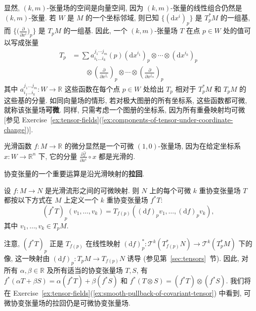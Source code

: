 显然, $(k,m)$-张量场的空间是向量空间, 因为 $(k,m)$-张量的线性组合仍然是 $(k,m)$-张量. 若 $W$ 是 $M$ 的一个坐标邻域, 则已知 $\{(\mathrm{d}x^i)_p\}$ 是 $T_p^*M$ 的一组基, 而 $\bigl\{\bigl(\frac{\partial}{\partial x^i}\bigr)_p\bigr\}$ 是 $T_pM$ 的一组基. 因此, 一个 $(k,m)$-张量场 $T$ 在点 $p\in W$ 处的值可以写成张量
\begin{align*}
  T_p&=\sum a_{i_1\ldots i_k}^{j_1\cdots j_m}(p)
  (\mathrm{d}x^{i_1})_p\otimes\cdots\otimes(\mathrm{d}x^{i_k})_p\\
  &\qquad\otimes\left(\frac{\partial}{\partial x^{j_1}}\right)_p
  \otimes\cdots\otimes\left(\frac{\partial}{\partial x^{j_m}}\right)_p
\end{align*}
其中 $a_{i_1\ldots i_k}^{j_1\ldots j_m}:W\to\mathbb{R}$ 这些函数在每个点 $p\in W$ 处给出 $T_p$ 相对于 $T_p^*M$ 和 $T_pM$ 的这些基的分量. 如同向量场的情形, 若对极大图册的所有坐标系, 这些函数都可微, 就称该张量场\textbf{可微}. 同样, 只需考虑一个图册的坐标系, 因为所有重叠映射均可微 [参见 Exercise~\ref{ex:tensor-fields}(\ref{ex:components-of-tensor-under-coordinate-change})].

\begin{RiemannExample}\label{ex:smooth-function-has-smooth-differential}
光滑函数 $f:M\to\mathbb{R}$ 的微分显然是一个可微 $(1,0)$-张量场, 因为在给定坐标系 $x:W\to\mathbb{R}^n$ 下, 它的分量 $\frac{\partial\widehat f}{\partial x^i}\circ x$ 都是光滑的.
\end{RiemannExample}

协变张量的一个重要运算是沿光滑映射的\textbf{拉回}.

\begin{RiemannDefinition}\label{def:pullback-of-covariant-tensor-field}
设 $f:M\to N$ 是光滑流形之间的可微映射. 则 $N$ 上的每个可微 $k$ 重协变张量场 $T$ 都按以下方式在 $M$ 上定义一个 $k$ 重协变张量场 $f^*T$:
\[
  (f^*T)_p(v_1,\ldots,v_k)=T_{f(p)}((\mathrm{d}f)_pv_1,\ldots,(\mathrm{d}f)_pv_k),
\]
其中 $v_1,\ldots,v_k\in T_pM$.
\end{RiemannDefinition}

\begin{RiemannRemark}\label{rem:pointwise-and-algebraic-properties-of-tensor-pullback}
注意, $(f^*T)_p$ 正是 $T_{f(p)}$ 在线性映射 $(\mathrm{d}f)_p^*:\mathcal{T}^k(T_{f(p)}^*N)\to\mathcal{T}^k(T_p^*M)$ 下的像, 这一映射由 $(\mathrm{d}f)_p:T_pM\to T_{f(p)}N$ 诱导 (参见第~\ref{sec:tensors}~节). 因此, 对所有 $\alpha,\beta\in\mathbb{R}$ 及所有适当的协变张量场 $T,S$, 有 $f^*(\alpha T+\beta S)=\alpha(f^*T)+\beta(f^*S)$ 和 $f^*(T\otimes S)=(f^*T)\otimes(f^*S)$. 我们将在 Exercise~\ref{ex:tensor-fields}(\ref{ex:smooth-pullback-of-covariant-tensor}) 中看到, 可微协变张量场的拉回仍是可微协变张量场.
\end{RiemannRemark}

